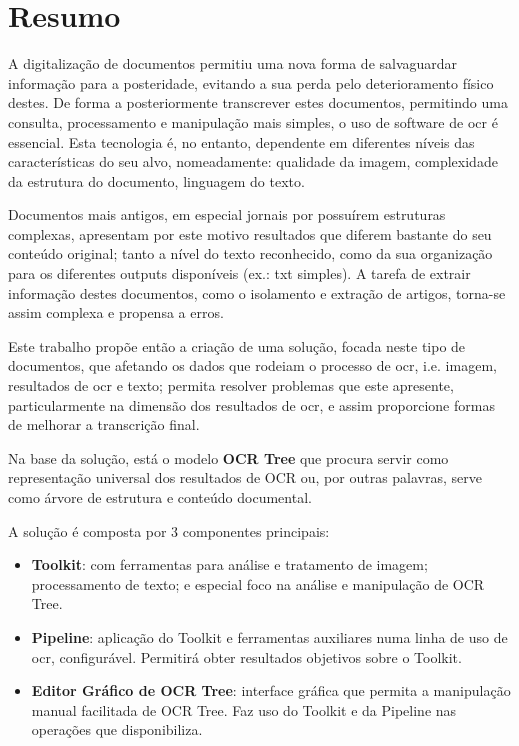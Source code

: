 \chapter*{Resumo}
\vspace{-2em}


A digitalização de documentos permitiu uma nova forma de salvaguardar informação para a posteridade, evitando a sua perda pelo deterioramento físico destes. De forma a posteriormente transcrever estes documentos, permitindo uma consulta, processamento e manipulação mais simples, o uso de software de \acrshort{ocr} é essencial. Esta tecnologia é, no entanto, dependente em diferentes níveis das características do seu alvo, nomeadamente: qualidade da imagem, complexidade da estrutura do documento, linguagem do texto. 

Documentos mais antigos, em especial jornais por possuírem estruturas complexas, apresentam por este motivo resultados que diferem bastante do seu conteúdo original; tanto a nível do texto reconhecido, como da sua organização para os diferentes outputs disponíveis (ex.: txt simples). A tarefa de extrair informação destes documentos, como o isolamento e extração de artigos, torna-se assim complexa e propensa a erros. 

Este trabalho propõe então a criação de uma solução, focada neste tipo de documentos, que afetando os dados que rodeiam o processo de \acrshort{ocr}, i.e. imagem, resultados de \acrshort{ocr} e texto; permita resolver problemas que este apresente, particularmente na dimensão dos resultados de \acrshort{ocr}, e assim proporcione formas de melhorar a transcrição final. 

Na base da solução, está o modelo \textbf{OCR Tree} que procura servir como representação universal dos resultados de OCR ou, por outras palavras, serve como árvore de estrutura e conteúdo documental.

A solução é composta por 3 componentes principais:
\begin{itemize}\setlength\itemsep{-0.5em}
	\vspace{-0.5em}
	\item \textbf{Toolkit}: com ferramentas para análise e tratamento de imagem; processamento de texto; e especial foco na análise e manipulação de OCR Tree.
	\item \textbf{Pipeline}: aplicação do Toolkit e ferramentas auxiliares numa linha de uso de \acrshort{ocr}, configurável. Permitirá obter resultados objetivos sobre o Toolkit.
	\item \textbf{Editor Gráfico de OCR Tree}: interface gráfica que permita a manipulação manual facilitada de OCR Tree. Faz uso do Toolkit e da Pipeline nas operações que disponibiliza.
\end{itemize}




